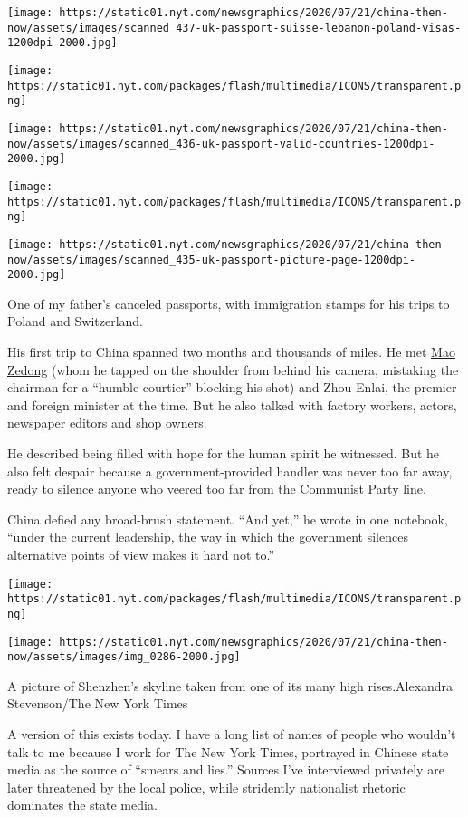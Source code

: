 \texttt{[image: https://static01.nyt.com/newsgraphics/2020/07/21/china-then-now/assets/images/scanned\_437-uk-passport-suisse-lebanon-poland-visas-1200dpi-2000.jpg]}

\texttt{[image: https://static01.nyt.com/packages/flash/multimedia/ICONS/transparent.png]}

\texttt{[image: https://static01.nyt.com/newsgraphics/2020/07/21/china-then-now/assets/images/scanned\_436-uk-passport-valid-countries-1200dpi-2000.jpg]}

\texttt{[image: https://static01.nyt.com/packages/flash/multimedia/ICONS/transparent.png]}

\texttt{[image: https://static01.nyt.com/newsgraphics/2020/07/21/china-then-now/assets/images/scanned\_435-uk-passport-picture-page-1200dpi-2000.jpg]}

One of my father's canceled passports, with immigration stamps for his
trips to Poland and Switzerland.

His first trip to China spanned two months and thousands of miles. He
met
\href{https://archive.nytimes.com/www.nytimes.com/library/world/asia/061357mao-inthenews.html}{Mao
Zedong} (whom he tapped on the shoulder from behind his camera,
mistaking the chairman for a ``humble courtier'' blocking his shot) and
Zhou Enlai, the premier and foreign minister at the time. But he also
talked with factory workers, actors, newspaper editors and shop owners.

He described being filled with hope for the human spirit he witnessed.
But he also felt despair because a government-provided handler was never
too far away, ready to silence anyone who veered too far from the
Communist Party line.

China defied any broad-brush statement. ``And yet,'' he wrote in one
notebook, ``under the current leadership, the way in which the
government silences alternative points of view makes it hard not to.''

\texttt{[image: https://static01.nyt.com/packages/flash/multimedia/ICONS/transparent.png]}

\texttt{[image: https://static01.nyt.com/newsgraphics/2020/07/21/china-then-now/assets/images/img\_0286-2000.jpg]}

A picture of Shenzhen's skyline taken from one of its many high
rises.Alexandra Stevenson/The New York Times

A version of this exists today. I have a long list of names of people
who wouldn't talk to me because I work for The New York Times, portrayed
in Chinese state media as the source of ``smears and lies.'' Sources
I've interviewed privately are later threatened by the local police,
while stridently nationalist rhetoric dominates the state media.

